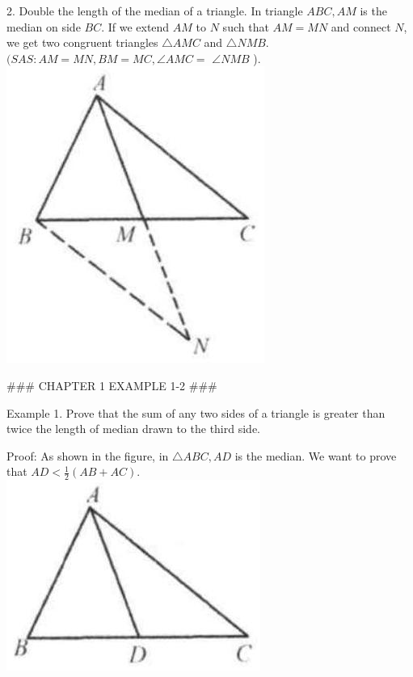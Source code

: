 \documentclass[10pt]{article}
\begin{document}
2. Double the length of the median of a triangle.
In triangle \(A B C, A M\) is the median on side \(B C\). If we extend \(A M\) to \(N\) such that \(A M=M N\) and connect \(N\), we get two congruent triangles \(\triangle A M C\) and \(\triangle N M B\). \((S A S: A M=M N, B M=M C, \angle A M C=\) \(\angle N M B\) ).\\
\includegraphics[max width=\textwidth, center]{2025_04_17_97bc1f7e44d93c271a88g-023}

### CHAPTER 1 EXAMPLE 1-2 ###

Example 1. Prove that the sum of any two sides of a triangle is greater than twice the length of median drawn to the third side.

Proof:
As shown in the figure, in \(\triangle A B C, A D\) is the median. We want to prove that \(A D<\frac{1}{2}(A B+A C)\).\\
\includegraphics[max width=\textwidth, center]{2025_04_17_97bc1f7e44d93c271a88g-023(1)}
\end{document}
